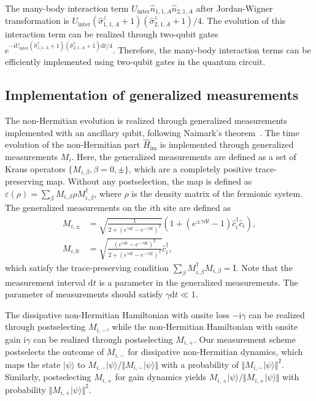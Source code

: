\documentclass[longbibliography, aps, prx, amsmath, amssymb, amsfonts, twocolumn,superscriptaddress, footinbib]{revtex4-1}
\begin{document}
	{The many-body interaction term $U_{\text{inter}} \hat{n}_{1, 1, A} \hat{n}_{2,1,A}$ after Jordan-Wigner transformation is $U_{\text{inter}} (\hat{\sigma}^z_{1,1,A}+1)(\hat{\sigma}^z_{2,1,A}+1)/4$. The evolution of this interaction term can be realized through two-qubit gates $e^{-\mathrm{i} U_{\text{inter}} (\hat{\sigma}^z_{1,1,A}+1) (\hat{\sigma}^z_{2,1,A}+1) \mathrm{d}t/4}$. Therefore, the many-body interaction terms can be efficiently implemented using two-qubit gates in the quantum circuit.}
	
	\subsection{{Implementation of generalized measurements}}
	\label{sec:measurement_implementation}
	
	{The non-Hermitian evolution is realized through generalized measurements implemented with an ancillary qubit, following Naimark's theorem~\cite{coecke2008povms,nielsen2001quantum}.} {The time evolution of the non-Hermitian part $\hat{H}_{\text{im}}$ is implemented through generalized measurements $M_i$. Here, the generalized measurements are defined as a set of Kraus operators $\{M_{i,\beta},\beta=0,\pm \}$, which are a completely positive trace-preserving map. Without any postselection, the map is defined as}
	{$\varepsilon(\rho) = \sum_{\beta} M_{i, \beta} \rho M_{i, \beta}^{\dagger}$, where $\rho$ is the density matrix of the fermionic system.}
	{The generalized measurements on the $i$th site are defined as}
	\begin{align}
		{ M_{i,\pm}} &{ = \sqrt{\frac{1}{2+(e^{\gamma \mathrm{d} t} - e^{-\gamma \mathrm{d} t})^2}} (1 + (e^{\pm \gamma \mathrm{d} t}-1) \hat{c}_i^{\dagger} \hat{c}_i),}\\
		{ M_{i,0}} &{ = \sqrt{\frac{(e^{\gamma \mathrm{d} t} - e^{-\gamma \mathrm{d} t})^2}{2+(e^{\gamma \mathrm{d} t} - e^{-\gamma \mathrm{d} t})^2}} \hat{c}_i^{\dagger},}
	\end{align}
	{which satisfy the trace-preserving condition $\sum_{\beta} M_{i,\beta}^{\dagger} M_{i,\beta}=\mathrm{I}$. Note that the measurement interval $\mathrm{d}t$ is a parameter in the generalized measurements. The parameter of measurements should satisfy $\gamma \mathrm{d} t \ll 1$.}
	
		{The dissipative non-Hermitian Hamiltonian with onsite loss 
$-\mathrm{i}\gamma$ can be realized through postselecting $M_{i,-}$, while the 
non-Hermitian Hamiltonian with onsite gain $\mathrm{i}\gamma$ can be realized 
through postselecting $M_{i,+}$.}
{Our measurement scheme postselects the outcome of $M_{i,-}$ 
for dissipative non-Hermitian dynamics, which maps the state $\vert \psi \rangle$ 
to $M_{i,-} \vert \psi \rangle/\Vert M_{i,-} \vert \psi \rangle \Vert$ with a 
probability of $\Vert M_{i,-} \vert \psi \rangle \Vert^2$. Similarly, postselecting 
$M_{i,+}$ for gain dynamics yields $M_{i,+} \vert \psi \rangle/\Vert M_{i,+} 
\vert \psi \rangle \Vert$ with probability $\Vert M_{i,+} \vert \psi \rangle \Vert^2$.}
\end{document}
